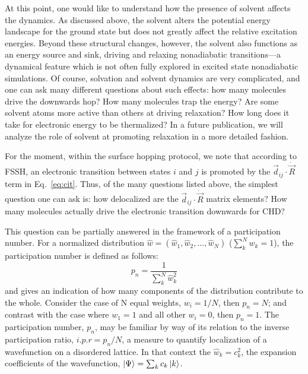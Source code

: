 \documentclass[journal=jctcce,manuscript=article,layout=traditional]{achemso}
\newcommand{\refeq}[1]{Eq.~\ref{#1}}
\begin{document}
At this point, one would like to understand how the presence of solvent affects the dynamics.  As discussed above, the solvent alters the potential energy landscape for the ground state but does not greatly affect the relative excitation energies.  Beyond these structural changes, however, the solvent also functions as an energy source and sink, driving and relaxing nonadiabatic transitions---a dynamical feature which is not often fully explored in excited state nonadiabatic simulations. Of course, solvation and solvent dynamics are very complicated, and one can ask many different questions about such effects: how many molecules drive the downwards hop? How many molecules trap the energy? Are some solvent atoms more active than others at driving relaxation? How long does it take for electronic energy to be thermalized? In a future publication, we will analyze the role of solvent at promoting relaxation in a more detailed fashion. 


For the moment, within the surface hopping protocol, we note that according to FSSH,  an electronic transition between states $i$ and $j$ is promoted by the $\vec{d}_{ij}\cdot\dot{\vec{R}}$ term in \refeq{eq:cit}. Thus, of the many questions listed above, the simplest question one can ask is: how delocalized are the $\vec{d}_{ij}\cdot\dot{\vec{R}}$ matrix elements? How many molecules actually drive the electronic transition downwards for CHD?

This question can be partially answered in the framework of a participation number. For a normalized distribution $\hat{w}=(\hat{w}_1, \hat{w}_2,\ldots, \hat{w}_N)$ ($\sum_k^N w_k = 1$), the participation number is defined as follows:
\begin{equation}
    p_n = \frac{1}{\sum_k^N \hat{w}_k^2}
\end{equation}
and gives an indication of how many components of the distribution contribute to the whole.
Consider the case of N equal weights, $w_i=1/N$, then $p_n=N$; and contrast with the case where $w_1=1$ and all other $w_i=0$, then $p_n = 1$.
The participation number, $p_n$, may be familiar by way of its relation to the inverse participation ratio, $i.p.r = p_n/N$, a measure to quantify localization of a wavefunction on a disordered lattice\cite{weaire1976:ipr}. In that context the $\hat{w}_k=c_k^2$, the expansion coefficients of the wavefunction, $\ket{\Psi}=\sum_k c_k \ket{k}$.
\end{document}
